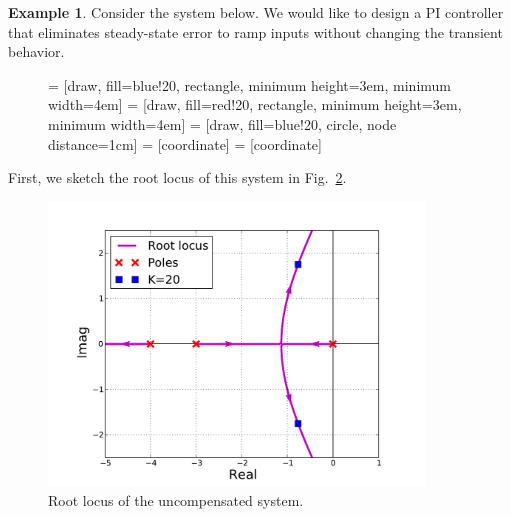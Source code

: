 \documentclass[a4paper,11pt]{report}
\theoremstyle{definition}
\newtheorem{mdexample}{Example}
\newenvironment{example}%
  {\vspace{0.1cm}\begin{mdframed}[backgroundcolor=lightgray]\begin{mdexample}}%
  {\end{mdexample}\end{mdframed}\vspace{0.1cm}}
\begin{document}
\begin{example}
  \label{ex:pidesign}
  Consider the system below. We would like to design a PI controller
  that eliminates steady-state error to ramp inputs without changing
  the transient behavior.
  \begin{figure}[H]
    \label{fig:pddesign}
    \centering
     = [draw, fill=blue!20, rectangle, minimum height=3em, minimum width=4em]
     = [draw, fill=red!20, rectangle, minimum height=3em, minimum width=4em]
     = [draw, fill=blue!20, circle, node distance=1cm]
     = [coordinate]
     = [coordinate]
  \end{figure}

  First, we sketch the root locus of this system in
  Fig.~\ref{fig:design-uncomp2}.

  \begin{figure}[H]
    \centering
    \includegraphics[width=10cm]{fig/design-uncomp2.pdf}
    \caption{Root locus of the uncompensated system.}
    \label{fig:design-uncomp2}
  \end{figure}


\end{example}
\end{document}
